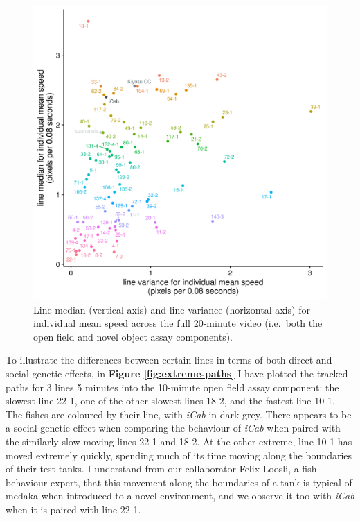 \documentclass[
]{book}
\begin{document}
\begin{figure}
\includegraphics[width=1\linewidth]{figs/mikk_behaviour/line_mean_speed_variance_0.05_all} \caption{Line median (vertical axis) and line variance (horizontal axis) for individual mean speed across the full 20-minute video (i.e.~both the open field and novel object assay components).}\label{fig:mikk-mean-speed-variance}
\end{figure}

To illustrate the differences between certain lines in terms of both direct and social genetic effects, in \textbf{Figure \ref{fig:extreme-paths}} I have plotted the tracked paths for 3 lines 5 minutes into the 10-minute open field assay component: the slowest line \textcolor{22-1_FB737A}{22-1}, one of the other slowest lines \textcolor{18-2_FF66A6}{18-2}, and the fastest line \textcolor{10-1_F8766D}{10-1}. The fishes are coloured by their line, with \emph{\textcolor{iCab_424B4D}{iCab}} in dark grey. There appears to be a social genetic effect when comparing the behaviour of \emph{\textcolor{iCab_424B4D}{iCab}} when paired with the similarly slow-moving lines \textcolor{22-1_FB737A}{22-1} and \textcolor{18-2_FF66A6}{18-2}. At the other extreme, line \textcolor{10-1_F8766D}{10-1} has moved extremely quickly, spending much of its time moving along the boundaries of their test tanks. I understand from our collaborator Felix Loosli, a fish behaviour expert, that this movement along the boundaries of a tank is typical of medaka when introduced to a novel environment, and we observe it too with \emph{\textcolor{iCab_424B4D}{iCab}} when it is paired with line \textcolor{22-1_FB737A}{22-1}.
\end{document}
